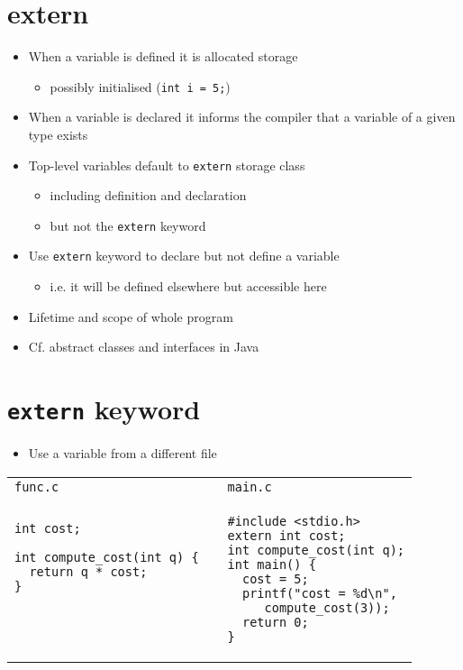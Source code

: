 \documentclass{article}
\begin{document}
\section{extern}
\begin{itemize}
\item When a variable is defined it is allocated storage
\begin{itemize}
\item possibly initialised (\verb!int i = 5;!)
\end{itemize}
\item When a variable is declared it informs the compiler that a variable of a given type exists
\item Top-level variables default to \verb!extern! storage class
\begin{itemize}
\item including definition and declaration
\item but not the \verb!extern! keyword
\end{itemize}
\item Use \verb!extern! keyword to declare but not define a variable
\begin{itemize}
\item i.e. it will be defined elsewhere but accessible here
\end{itemize}
\item Lifetime and scope of whole program
\item Cf. abstract classes and interfaces in Java
\end{itemize}



\section{\texttt{extern} keyword}
\begin{itemize}
\item Use a variable from a different file
\end{itemize}
\begin{tabular}{lll}
\texttt{func.c} &  & \texttt{main.c}\\
\begin{boxedminipage}{5.3cm}
\begin{verbatim}
int cost;

int compute_cost(int q) {
  return q * cost;
}




\end{verbatim}
\end{boxedminipage}
&&
\begin{boxedminipage}{5cm}
\begin{verbatim}
#include <stdio.h>
extern int cost;
int compute_cost(int q);
int main() {
  cost = 5;
  printf("cost = %d\n",
     compute_cost(3));
  return 0;
}
\end{verbatim}
\end{boxedminipage}
\end{tabular}
\end{document}
